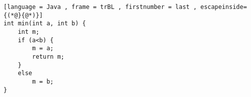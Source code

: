 \begin{lstlisting}[language = Java , frame = trBL , firstnumber = last , escapeinside={(*@}{@*)}]
int min(int a, int b) {
    int m;
    if (a<b) {
        m = a;
        return m;
    }
    else
        m = b;
}
\end{lstlisting}
